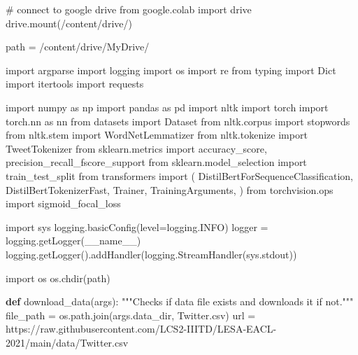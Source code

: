 \documentclass[
  letterpaper,
  DIV=11,
  numbers=noendperiod]{scrartcl}
\newenvironment{Shaded}{\begin{snugshade}}{\end{snugshade}}
\newcommand{\CommentTok}[1]{\textcolor[rgb]{0.37,0.37,0.37}{#1}}
\newcommand{\ImportTok}[1]{\textcolor[rgb]{0.00,0.46,0.62}{#1}}
\newcommand{\KeywordTok}[1]{\textcolor[rgb]{0.00,0.23,0.31}{\textbf{#1}}}
\newcommand{\NormalTok}[1]{\textcolor[rgb]{0.00,0.23,0.31}{#1}}
\newcommand{\OperatorTok}[1]{\textcolor[rgb]{0.37,0.37,0.37}{#1}}
\newcommand{\StringTok}[1]{\textcolor[rgb]{0.13,0.47,0.30}{#1}}
\newcommand{\VariableTok}[1]{\textcolor[rgb]{0.07,0.07,0.07}{#1}}
\begin{document}
\begin{Shaded}
\begin{Highlighting}[]
\CommentTok{\# connect to google drive}
\ImportTok{from}\NormalTok{ google.colab }\ImportTok{import}\NormalTok{ drive}
\NormalTok{drive.mount(}\StringTok{\textquotesingle{}/content/drive/\textquotesingle{}}\NormalTok{)}

\NormalTok{path }\OperatorTok{=} \StringTok{\textquotesingle{}/content/drive/MyDrive/\textquotesingle{}}


\ImportTok{import}\NormalTok{ argparse}
\ImportTok{import}\NormalTok{ logging}
\ImportTok{import}\NormalTok{ os}
\ImportTok{import}\NormalTok{ re}
\ImportTok{from}\NormalTok{ typing }\ImportTok{import}\NormalTok{ Dict}
\ImportTok{import}\NormalTok{ itertools}
\ImportTok{import}\NormalTok{ requests}

\ImportTok{import}\NormalTok{ numpy }\ImportTok{as}\NormalTok{ np}
\ImportTok{import}\NormalTok{ pandas }\ImportTok{as}\NormalTok{ pd}
\ImportTok{import}\NormalTok{ nltk}
\ImportTok{import}\NormalTok{ torch}
\ImportTok{import}\NormalTok{ torch.nn }\ImportTok{as}\NormalTok{ nn}
\ImportTok{from}\NormalTok{ datasets }\ImportTok{import}\NormalTok{ Dataset}
\ImportTok{from}\NormalTok{ nltk.corpus }\ImportTok{import}\NormalTok{ stopwords}
\ImportTok{from}\NormalTok{ nltk.stem }\ImportTok{import}\NormalTok{ WordNetLemmatizer}
\ImportTok{from}\NormalTok{ nltk.tokenize }\ImportTok{import}\NormalTok{ TweetTokenizer}
\ImportTok{from}\NormalTok{ sklearn.metrics }\ImportTok{import}\NormalTok{ accuracy\_score, precision\_recall\_fscore\_support}
\ImportTok{from}\NormalTok{ sklearn.model\_selection }\ImportTok{import}\NormalTok{ train\_test\_split}
\ImportTok{from}\NormalTok{ transformers }\ImportTok{import}\NormalTok{ (}
\NormalTok{    DistilBertForSequenceClassification,}
\NormalTok{    DistilBertTokenizerFast,}
\NormalTok{    Trainer,}
\NormalTok{    TrainingArguments,}
\NormalTok{)}
\ImportTok{from}\NormalTok{ torchvision.ops }\ImportTok{import}\NormalTok{ sigmoid\_focal\_loss}


\ImportTok{import}\NormalTok{ sys}
\NormalTok{logging.basicConfig(level}\OperatorTok{=}\NormalTok{logging.INFO)}
\NormalTok{logger }\OperatorTok{=}\NormalTok{ logging.getLogger(}\VariableTok{\_\_name\_\_}\NormalTok{)}
\NormalTok{logging.getLogger().addHandler(logging.StreamHandler(sys.stdout))}

\ImportTok{import}\NormalTok{ os}
\NormalTok{os.chdir(path)}

\KeywordTok{def}\NormalTok{ download\_data(args):}
    \CommentTok{"""Checks if data file exists and downloads it if not."""}
\NormalTok{    file\_path }\OperatorTok{=}\NormalTok{ os.path.join(args.data\_dir, }\StringTok{\textquotesingle{}Twitter.csv\textquotesingle{}}\NormalTok{)}
\NormalTok{    url }\OperatorTok{=} \StringTok{\textquotesingle{}https://raw.githubusercontent.com/LCS2{-}IIITD/LESA{-}EACL{-}2021/main/data/Twitter.csv\textquotesingle{}}


\end{Highlighting}
\end{Shaded}
\end{document}
